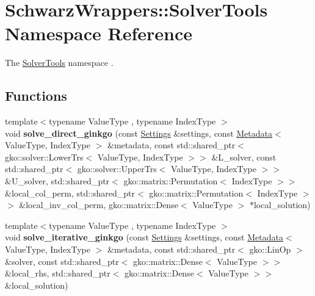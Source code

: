 \hypertarget{namespaceSchwarzWrappers_1_1SolverTools}{}\section{Schwarz\+Wrappers\+:\+:Solver\+Tools Namespace Reference}
\label{namespaceSchwarzWrappers_1_1SolverTools}


The \hyperlink{namespaceSchwarzWrappers_1_1SolverTools}{Solver\+Tools} namespace .  


\subsection*{Functions}
\begin{DoxyCompactItemize}
\item 
\mbox{\label{namespaceSchwarzWrappers_1_1SolverTools_a95715207c18b44266f0652bca9e38dd7}} 
{\footnotesize template$<$typename Value\+Type , typename Index\+Type $>$ }\\void {\bfseries solve\+\_\+direct\+\_\+ginkgo} (const \hyperlink{structSchwarzWrappers_1_1Settings}{Settings} \&settings, const \hyperlink{structSchwarzWrappers_1_1Metadata}{Metadata}$<$ Value\+Type, Index\+Type $>$ \&metadata, const std\+::shared\+\_\+ptr$<$ gko\+::solver\+::\+Lower\+Trs$<$ Value\+Type, Index\+Type $>$$>$ \&L\+\_\+solver, const std\+::shared\+\_\+ptr$<$ gko\+::solver\+::\+Upper\+Trs$<$ Value\+Type, Index\+Type $>$$>$ \&U\+\_\+solver, std\+::shared\+\_\+ptr$<$ gko\+::matrix\+::\+Permutation$<$ Index\+Type $>$$>$ \&local\+\_\+col\+\_\+perm, std\+::shared\+\_\+ptr$<$ gko\+::matrix\+::\+Permutation$<$ Index\+Type $>$$>$ \&local\+\_\+inv\+\_\+col\+\_\+perm, gko\+::matrix\+::\+Dense$<$ Value\+Type $>$ $\ast$local\+\_\+solution)
\item 
\mbox{\label{namespaceSchwarzWrappers_1_1SolverTools_aa6565c66ced28257126628dfcef5759b}} 
{\footnotesize template$<$typename Value\+Type , typename Index\+Type $>$ }\\void {\bfseries solve\+\_\+iterative\+\_\+ginkgo} (const \hyperlink{structSchwarzWrappers_1_1Settings}{Settings} \&settings, const \hyperlink{structSchwarzWrappers_1_1Metadata}{Metadata}$<$ Value\+Type, Index\+Type $>$ \&metadata, const std\+::shared\+\_\+ptr$<$ gko\+::\+Lin\+Op $>$ \&solver, const std\+::shared\+\_\+ptr$<$ gko\+::matrix\+::\+Dense$<$ Value\+Type $>$$>$ \&local\+\_\+rhs, std\+::shared\+\_\+ptr$<$ gko\+::matrix\+::\+Dense$<$ Value\+Type $>$$>$ \&local\+\_\+solution)

\end{DoxyCompactItemize}
